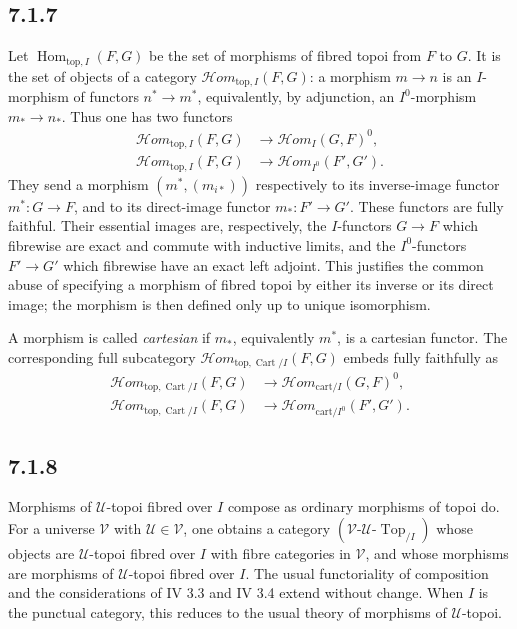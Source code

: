 \documentclass[11pt]{article}
\newcommand{\U}{\mathcal{U}}
\newcommand{\V}{\mathcal{V}}
\newcommand{\Top}{\operatorname{Top}}
\newcommand{\Cart}{\operatorname{Cart}}
\newcommand{\cart}{\mathrm{cart}}
\begin{document}
\subsection*{7.1.7}
Let \(\operatorname{Hom}_{\mathrm{top},I}(F,G)\) be the set of morphisms of fibred topoi from \(F\) to \(G\). It is the set of objects of a category \(\mathcal{H}om_{\mathrm{top},I}(F,G)\): a morphism \(m\to n\) is an \(I\)-morphism of functors \(n^*\to m^*\), equivalently, by adjunction, an \(I^0\)-morphism \(m_*\to n_*\). Thus one has two functors
\begin{align}
\mathcal{H}om_{\mathrm{top},I}(F,G)&\to\mathcal{H}om_I(G,F)^0, \tag{7.1.7.1}\\
\mathcal{H}om_{\mathrm{top},I}(F,G)&\to\mathcal{H}om_{I^0}(F',G'). \tag{7.1.7.2}
\end{align}
They send a morphism \((m^*,(m_{i*}))\) respectively to its inverse-image functor \(m^*:G\to F\), and to its direct-image functor \(m_*:F'\to G'\). These functors are fully faithful. Their essential images are, respectively, the \(I\)-functors \(G\to F\) which fibrewise are exact and commute with inductive limits, and the \(I^0\)-functors \(F'\to G'\) which fibrewise have an exact left adjoint. This justifies the common abuse of specifying a morphism of fibred topoi by either its inverse or its direct image; the morphism is then defined only up to unique isomorphism.

A morphism is called \emph{cartesian} if \(m_*\), equivalently \(m^*\), is a cartesian functor. The corresponding full subcategory \(\mathcal{H}om_{\mathrm{top},\Cart/I}(F,G)\) embeds fully faithfully as
\begin{align}
\mathcal{H}om_{\mathrm{top},\Cart/I}(F,G)&\to\mathcal{H}om_{\cart/I}(G,F)^0, \tag{7.1.7.3}\\
\mathcal{H}om_{\mathrm{top},\Cart/I}(F,G)&\to\mathcal{H}om_{\cart/I^0}(F',G'). \tag{7.1.7.4}
\end{align}

\subsection*{7.1.8}
Morphisms of \(\U\)-topoi fibred over \(I\) compose as ordinary morphisms of topoi do. For a universe \(\V\) with \(\U\in\V\), one obtains a category \((\V\text{-}\U\text{-}\Top_{/I})\) whose objects are \(\U\)-topoi fibred over \(I\) with fibre categories in \(\V\), and whose morphisms are morphisms of \(\U\)-topoi fibred over \(I\). The usual functoriality of composition and the considerations of IV 3.3 and IV 3.4 extend without change. When \(I\) is the punctual category, this reduces to the usual theory of morphisms of \(\U\)-topoi.
\end{document}
